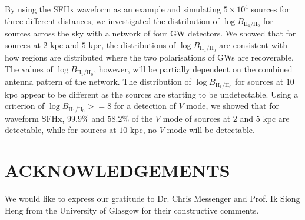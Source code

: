 \documentclass[aps,twocolumn,showpacs,groupedaddress, nofootinbib]{revtex4}  %
\begin{document}
By using the SFHx waveform as an example and simulating $5\times10^4$ sources for three different distances, 
we investigated the distribution of $\log B_{\text{H}_1 / \text{H}_0}$  for sources across the sky with a network of four \ac{GW} detectors.
We showed that for sources at $2$ kpc and $5$ kpc, the distributions of $\log B_{\text{H}_1 / \text{H}_0}$
are consistent with how regions are distributed where the two polarisations of \acp{GW} are recoverable.
The values of $\log B_{\text{H}_1 / \text{H}_0}$, however, will be partially dependent on the combined antenna pattern of the network.
The distribution of $\log B_{\text{H}_1 / \text{H}_0}$ for sources at $10$ kpc appear to be different as the sources are starting to be undetectable.
Using a criterion of $\log B_{\text{H}_1 / \text{H}_0} >=8 $ for a detection of $V$ mode, we showed that for waveform SFHx, $99.9\%$ and $58.2\%$
of the $V$ mode of sources at $2$ and $5$ kpc are detectable, while for sources at $10$ kpc, no $V$ mode will be detectable.


\section{ACKNOWLEDGEMENTS}
We would like to express our gratitude to Dr. Chris Messenger and  Prof. Ik Siong Heng 
from the University of Glasgow for their constructive comments.


\end{document}
